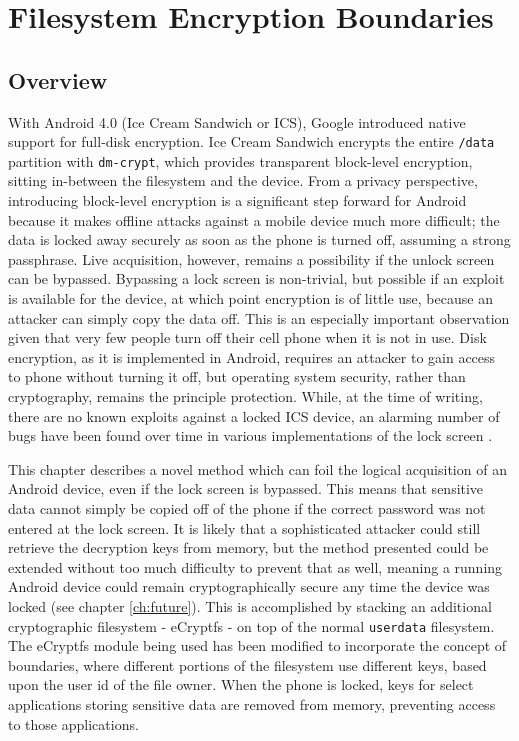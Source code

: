\chapter{Filesystem Encryption Boundaries}
\label{ch:ecryptfs}

\section{Overview} 
With Android 4.0 (Ice Cream Sandwich or ICS), Google introduced native support for full-disk encryption. Ice Cream Sandwich encrypts
the entire \texttt{/data} partition with \texttt{dm-crypt}, which provides transparent block-level encryption, sitting in-between
the filesystem and the device. From a privacy perspective, introducing block-level encryption is a significant step forward for
Android because it makes offline attacks against a mobile device much more difficult; the data is locked away securely as soon as
the phone is turned off, assuming a strong passphrase. Live acquisition, however, remains a possibility if the unlock screen can be
bypassed.  Bypassing a lock screen is non-trivial, but possible if an exploit is available for the device, at which point encryption
is of little use, because an attacker can simply copy the data off. This is an especially important observation given that very few
people turn off their cell phone when it is not in use. Disk encryption, as it is implemented in Android, requires an attacker to
gain access to phone without turning it off, but operating system security, rather than cryptography, remains the principle
protection. While, at the time of writing, there are no known exploits against a locked ICS device, an alarming number of bugs have
been found over time in various implementations of the lock screen
\cite{lockscreenbypass0} \cite{lockscreenbypass1} \cite{lockscreenbypass2}.

This chapter describes a novel method which can foil the logical acquisition of an Android device, even if the lock screen is
bypassed. This means that sensitive data cannot simply be copied off of the phone if the correct password was not entered at the
lock screen. It is likely that a sophisticated attacker could still retrieve the decryption keys from memory, but the method
presented could be extended without too much difficulty to prevent that as well, meaning a running Android device could remain
cryptographically secure any time the device was locked (see chapter \ref{ch:future}). This is accomplished by stacking an
additional cryptographic filesystem - eCryptfs - on top of the normal \texttt{userdata} filesystem. The eCryptfs module being used
has been modified to incorporate the concept of boundaries, where different portions of the filesystem use different keys, based
upon the user id of the file owner. When the phone is locked, keys for select applications storing sensitive data are removed from
memory, preventing access to those applications.

